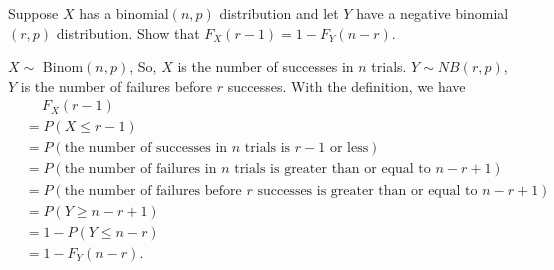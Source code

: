 \documentclass[14pt]{elegantbook}
\begin{document}
    \setcounter{exer}{11}
    \begin{exercise}
        Suppose $X$ has a binomial$(n,p)$ distribution and let $Y$ have a negative binomial$(r,p)$ distribution. Show that $F_X(r - 1)= 1- F_Y(n - r)$. 
    \end{exercise}
    \begin{solution}
        $X\sim$ Binom$(n,p)$, So, $X$ is the number of successes in $n$ trials. $Y\sim NB(r,p)$, $Y$ is the number of failures before $r$ successes. 
        With the definition, we have
        \begin{align*}
            &\quad\ F_X(r-1)\\
            &=P(X\leq r-1)\\
            &=P(\text{the number of successes in $n$ trials is $r-1$ or less})\\
            &=P(\text{the number of failures in $n$ trials is greater than or equal to $n-r+1$})\\
            &=P(\text{the number of failures before $r$ successes is greater than or equal to $n-r+1$})\\
            &=P(Y\geq n-r+1)\\
            &=1-P(Y\leq n-r)\\
            &=1-F_Y(n-r). 
        \end{align*}
    \end{solution}
\end{document}

